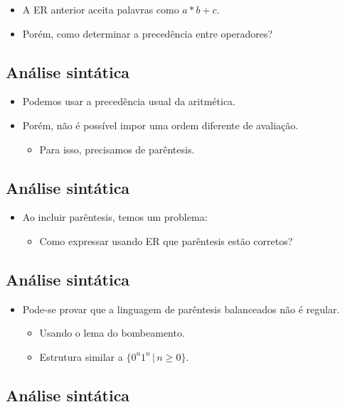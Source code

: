 \documentclass[11pt]{article}
\begin{document}
\begin{itemize}
\item A ER anterior aceita palavras como \(a * b + c\).

\item Porém, como determinar a precedência entre operadores?
\end{itemize}
\subsection*{Análise sintática}
\label{sec:org5edb33d}

\begin{itemize}
\item Podemos usar a precedência usual da aritmética.

\item Porém, não é possível impor uma ordem diferente de avaliação.
\begin{itemize}
\item Para isso, precisamos de parêntesis.
\end{itemize}
\end{itemize}
\subsection*{Análise sintática}
\label{sec:org7bc8dff}

\begin{itemize}
\item Ao incluir parêntesis, temos um problema:
\begin{itemize}
\item Como expressar usando ER que parêntesis estão corretos?
\end{itemize}
\end{itemize}
\subsection*{Análise sintática}
\label{sec:org874f3f8}

\begin{itemize}
\item Pode-se provar que a linguagem de parêntesis balanceados não é regular.
\begin{itemize}
\item Usando o lema do bombeamento.
\item Estrutura similar a \(\{0^n1^n\,|\,n\geq 0\}\).
\end{itemize}
\end{itemize}
\subsection*{Análise sintática}
\label{sec:org2557bdd}
\end{document}
